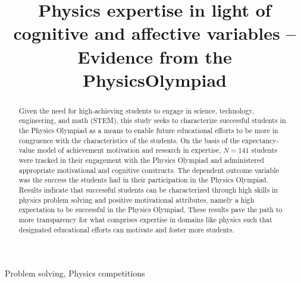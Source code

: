 \documentclass[]{interact}
\begin{document}

\title{Physics expertise in light of cognitive and affective variables -- Evidence from the PhysicsOlympiad}

\author{
}

\maketitle

\begin{abstract}
Given the need for high-achieving students to engage in science, technology, engineering, and math (STEM), this study seeks to characterize successful students in the Physics Olympiad as a means to enable future educational efforts to be more in congruence with the characteristics of the students. On the basis of the expectancy-value model of achievement motivation and research in expertise, $N=141$ students were tracked in their engagement with the Physics Olympiad and administered appropriate motivational and cognitive constructs. The dependent outcome variable was the success the students had in their participation in the Physics Olympiad. Results indicate that successful students can be characterized through high skills in physics problem solving and positive motivational attributes, namely a high expectation to be successful in the Physics Olympiad. These results pave the path to more transparency for what comprises expertise in domains like physics such that designated educational efforts can motivate and foster more students.
\end{abstract}

\begin{keywords}
Problem solving, Physics competitions
\end{keywords}

\maketitle
\end{document}
